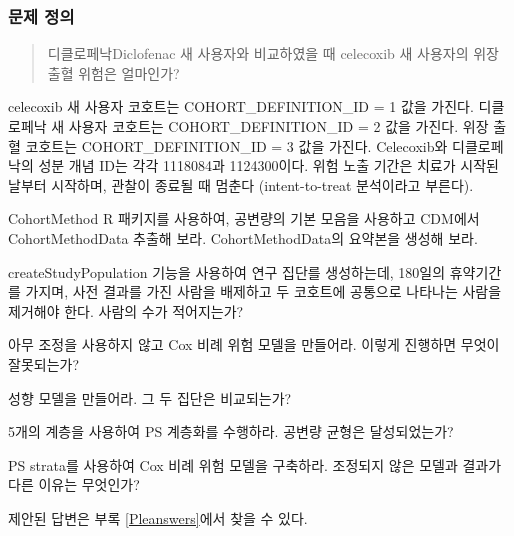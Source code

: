 \documentclass[10.5pt]{book}
\theoremstyle{definition}
\theoremstyle{definition}
\theoremstyle{definition}
\theoremstyle{remark}
\let\BeginKnitrBlock\begin \let\EndKnitrBlock\end
\begin{document}
\subsubsection*{문제 정의}\label{--2}

\begin{quote}
디클로페낙Diclofenac 새 사용자와 비교하였을 때 celecoxib 새 사용자의
위장 출혈 위험은 얼마인가?
\end{quote}

celecoxib 새 사용자 코호트는 COHORT\_DEFINITION\_ID = 1 값을 가진다.
디클로페낙 새 사용자 코호트는 COHORT\_DEFINITION\_ID = 2 값을 가진다.
위장 출혈 코호트는 COHORT\_DEFINITION\_ID = 3 값을 가진다. Celecoxib와
디클로페낙의 성분 개념 ID는 각각 1118084과 1124300이다. 위험 노출 기간은
치료가 시작된 날부터 시작하며, 관찰이 종료될 때 멈춘다 (intent-to-treat
분석이라고 부른다).

\BeginKnitrBlock{exercise}
\protect\hypertarget{exr:exercisePle1}{}{\label{exr:exercisePle1}
}CohortMethod R 패키지를 사용하여, 공변량의 기본 모음을 사용하고 CDM에서
CohortMethodData 추출해 보라. CohortMethodData의 요약본을 생성해 보라.
\EndKnitrBlock{exercise}

\BeginKnitrBlock{exercise}
\protect\hypertarget{exr:exercisePle2}{}{\label{exr:exercisePle2}
}createStudyPopulation 기능을 사용하여 연구 집단를 생성하는데, 180일의
휴약기간를 가지며, 사전 결과를 가진 사람을 배제하고 두 코호트에 공통으로
나타나는 사람을 제거해야 한다. 사람의 수가 적어지는가?
\EndKnitrBlock{exercise}

\BeginKnitrBlock{exercise}
\protect\hypertarget{exr:exercisePle3}{}{\label{exr:exercisePle3} }아무
조정을 사용하지 않고 Cox 비례 위험 모델을 만들어라. 이렇게 진행하면
무엇이 잘못되는가?
\EndKnitrBlock{exercise}

\BeginKnitrBlock{exercise}
\protect\hypertarget{exr:exercisePle4}{}{\label{exr:exercisePle4} }성향
모델을 만들어라. 그 두 집단은 비교되는가?
\EndKnitrBlock{exercise}

\BeginKnitrBlock{exercise}
\protect\hypertarget{exr:exercisePle5}{}{\label{exr:exercisePle5} }5개의
계층을 사용하여 PS 계층화를 수행하라. 공변량 균형은 달성되었는가?
\EndKnitrBlock{exercise}

\BeginKnitrBlock{exercise}
\protect\hypertarget{exr:exercisePle6}{}{\label{exr:exercisePle6} }PS
strata를 사용하여 Cox 비례 위험 모델을 구축하라. 조정되지 않은 모델과
결과가 다른 이유는 무엇인가?
\EndKnitrBlock{exercise}

제안된 답변은 부록 \ref{Pleanswers}에서 찾을 수 있다.
\end{document}
